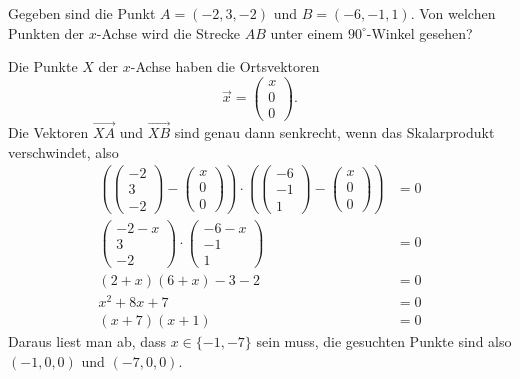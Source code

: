Gegeben sind die Punkt $A=(-2,3,-2)$ und $B=(-6,-1,1)$. Von welchen Punkten
der $x$-Achse wird die Strecke $AB$ unter einem $90^\circ$-Winkel gesehen?

\begin{loesung}
Die Punkte $X$ der $x$-Achse haben die Ortsvektoren
\[
\vec x=\begin{pmatrix}x\\0\\0\end{pmatrix}
.
\]
Die Vektoren $\overset{\rightarrow}{XA}$ und $\overset{\rightarrow}{XB}$ sind
genau dann senkrecht, wenn das Skalarprodukt verschwindet, also
\begin{align*}
\left(
\begin{pmatrix}-2\\3\\-2\end{pmatrix}
-
\begin{pmatrix}x\\0\\0\end{pmatrix}
\right)\cdot\left(
\begin{pmatrix}-6\\-1\\1\end{pmatrix}
-
\begin{pmatrix}x\\0\\0\end{pmatrix}
\right)
&=0
\\
\begin{pmatrix}-2-x\\3\\-2\end{pmatrix}
\cdot
\begin{pmatrix}-6-x\\-1\\1\end{pmatrix}
&=0
\\
(2+x)(6+x)-3-2&=0\\
x^2+8x+7&=0\\
(x+7)(x+1)&=0
\end{align*}
Daraus liest man ab, dass $x\in\{-1,-7\}$ sein muss, die gesuchten Punkte
sind also $(-1,0,0)$ und $(-7,0,0)$.
\end{loesung}

